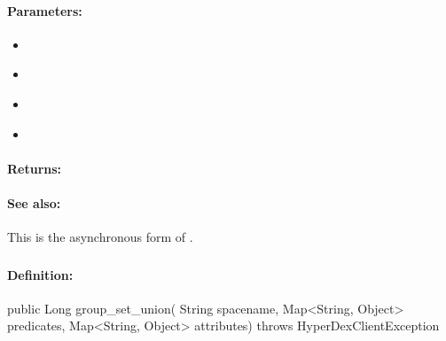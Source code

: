 \paragraph{Parameters:}
\begin{itemize}[noitemsep]
\item {}\\

\item {}\\

\item {}\\

\item {}\\

\end{itemize}

\paragraph{Returns:}


\paragraph{See also:}  This is the asynchronous form of .

\pagebreak
\subsubsection{}
\label{api:java:group_set_union}


\paragraph{Definition:}
\begin{javacode}
public Long group_set_union(
        String spacename,
        Map<String, Object> predicates,
        Map<String, Object> attributes) throws HyperDexClientException
\end{javacode}

